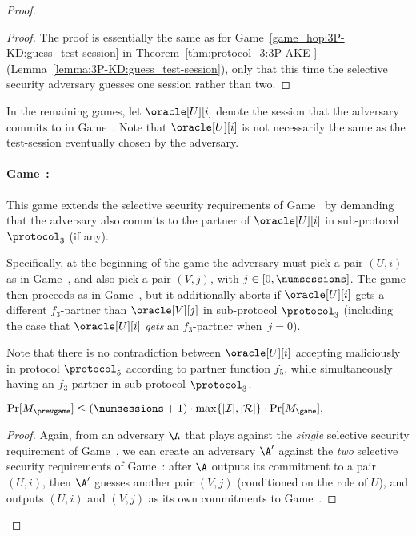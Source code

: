 \begin{proof}
\begin{proof}
The proof is essentially the same as for Game~\ref{game_hop:3P-KD:guess_test-session} in Theorem~\ref{thm:protocol_3:3P-AKE-} (Lemma~\ref{lemma:3P-KD:guess_test-session}),
only that this time the selective security adversary guesses one session rather than two. 
\end{proof}

In the remaining games,
let $\oracle[U][i]$ denote the session that the adversary commits to in Game~\game{}. 
Note that $\oracle[U][i]$ is not necessarily the same as the test-session eventually chosen by the adversary.

\newgame
\paragraph{Game~\game:}\label{game_hop:3P-AKE:P5:EA:guess_P3_partner}
This game extends the selective security requirements of Game~\prevgame{} by demanding that the adversary also commits to the partner of $\oracle[U][i]$ in sub-protocol $\protocol_3$ (if any).

Specifically,
at the beginning of the game the adversary must pick a pair $(U,i)$ as in Game~\prevgame{},
and also pick a pair $(V,j)$,
with $j \in [0, \numsessions]$.
The game then proceeds as in Game~\prevgame{},
but it additionally aborts if $\oracle[U][i]$ gets a different $f_3$-partner than $\oracle[V][j]$ in sub-protocol $\protocol_3$ 
(including the case that $\oracle[U][i]$ \emph{gets} an $f_3$-partner when~$j = 0$).


\begin{remark}
Note that there is no contradiction between $\oracle[U][i]$ accepting maliciously in protocol $\protocol_5$ according to partner function $f_5$,
while simultaneously having an $f_3$-partner in sub-protocol $\protocol_3$. 
\end{remark}

\begin{lemma}\label{lemma:3P-AKE-EA:selective-security:EA-target-p3-partner}
$
	\Pr[M_{\prevgame}]
	\leq (\numsessions + 1) \cdot \max \lbrace | \mathcal{I} |, | \mathcal{R} | \rbrace \cdot \Pr[M_{\game}],
$
\end{lemma}

\begin{proof}
Again,
from an adversary $\A$ that plays against the \emph{single} selective security requirement of Game~\prevgame{},
we can create an adversary $\A'$ against the \emph{two} selective security requirements of Game~\game{}:
after $\A$ outputs its commitment to a pair $(U,i)$,
then $\A'$ guesses another pair $(V,j)$
(conditioned on the role of $U$),
and outputs $(U,i)$ and $(V,j)$ as its own commitments to Game~\game{}.
\end{proof}


\end{proof}
